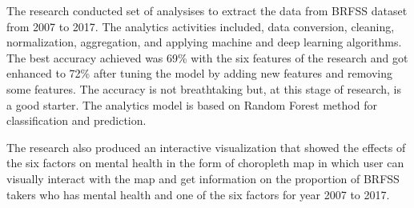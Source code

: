 \documentclass[letterpaper, 10 pt, conference]{ieeeconf}  %
\begin{document}
The research conducted set of analysises to extract the data from BRFSS dataset from 2007 to 2017. The analytics activities included, data conversion, 
cleaning, normalization, aggregation, and applying machine and deep learning algorithms. The best accuracy achieved was 69\% with the 
six features of the research and got enhanced to 72\% after tuning the model by adding new features and removing some features.
The accuracy is not breathtaking but, at this stage of research, is a good starter. The analytics model is based on Random Forest method
for classification and prediction.

The research also produced an interactive visualization that showed the effects of the six factors on mental health in the form of choropleth map
in which user can visually interact with the map and get information on the proportion of BRFSS takers who has mental health and one of the 
six factors for year 2007 to 2017. 

\captionsetup[figure]{labelformat=empty}
\clearpage 
\begin{figure}[hbt!]
        \centering
        
        \addvspace{250pt}
        
        \hspace{-10cm}
        
        \caption{}
        \label{fig:project-features}
\end{figure}
\clearpage 

\captionsetup[figure]{labelformat=empty}
\clearpage 
\begin{figure}[hbt!]
        \centering
        
        \addvspace{250pt}
        
        \hspace{-10cm}
        
        \caption{}
        \label{fig:map}
\end{figure}
\clearpage 

\captionsetup[figure]{labelformat=empty}
\clearpage 
\begin{figure}[hbt!]
        \centering
        
        \addvspace{250pt}
        
        \hspace{-10cm}
        
        \caption{}
        \label{fig:schedule}
\end{figure}
\end{document}
